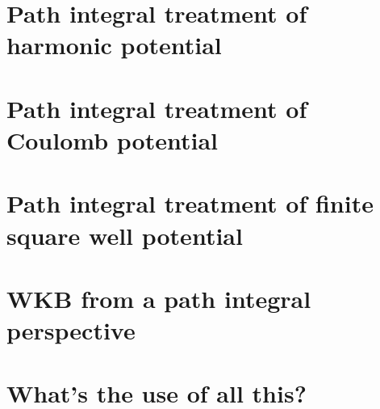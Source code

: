 \section{Path integral treatment of harmonic potential}
\begin{advanced}
\section{Path integral treatment of Coulomb potential}
\section{Path integral treatment of finite square well potential}
\end{advanced}
\section{WKB from a path integral perspective}
\section{What's the use of all this?}

\endinput






\begin{remark}
\`E importante rilevare che questo \`e un comunissimo integrale multiplo in
$\R^{N-1}$ del tipo che si incontra nei corsi introduttivi di analisi, non c'\`e
nulla di nuovo nel risolverlo, la novit\`a (\ie, il path integral) si ottiene
solo nel momento in cui si considera il passaggio al limite. 
\end{remark}
It is helpful to absorbe the coefficients via a preliminary redefinition of the
integration variables:
\begin{dmath*}
y_{k} = \left( \frac{m}{2\hbar \varepsilon} \right)^{\frac{1}{2}} x_{k}
\end{dmath*}
Let us also introduce analogous notations for the endpoints:
$x_{0} =x'$ and $x_{N} = x''$m bring in mind however that we are not
integrating over initial and final positions.

With this change of variables
\begin{dmath*}
\int_{\R^{N-1}} \prod_{k=1}^{N-1} \udiff{x_{k}} \uexp^{ \frac{i}{\hbar}
\frac{m}{2\varepsilon}
\sum_{k=1}^{N} \left(  x_{k} - x_{k-1} \right)^{2} } = 
\left( \frac{m}{2\hbar\varepsilon} \right)^{-\frac{N-1}{2}} 
\int_{\R^{N-1}} \prod_{k=1}^{N-1} \udiff{y_{k}} \uexp^{ i
\sum_{k=1}^{N} \left(  y_{k} - y_{k-1} \right)^{2} } \eqspace .
\end{dmath*}
This is a multi-dimensional Gaussian integral
Si tratta di un integrale multiplo Gaussiano, anche se certamente il fatto che le
variabili di integrazione $y_{k}$ siano accoppiate complica la faccenda, ci sono
vari modi per calcolare questo integrale.
Il modo standard di calcolarlo (disaccoppiare le $y_{k}$ diagonalizzando la forma quadratica a esponente) verr\`a
affrontato nella prossima sezione, prima presentiamo il metodo probabilmente pi\`u
diretto, ovvero:
si considera qualche esempio esplicito ($N=2$, $N=3$\ldots), si 
identifica un pattern
generale e si dimostra per induzione che il pattern \`e verificato.

